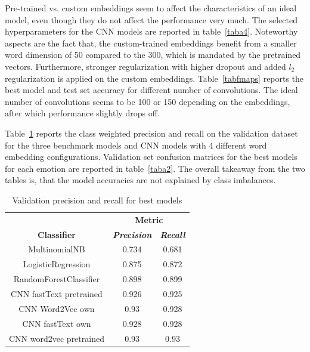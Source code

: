\documentclass[conference]{IEEEtran}
\begin{document}
Pre-trained vs. custom embeddings seem to affect the characteristics of an ideal model, even though they do not affect the performance very much. The selected hyperparameters for the CNN models are reported in table~\ref{taba4}. Noteworthy aspects are the fact that, the custom-trained embeddings benefit from a smaller word dimension of 50 compared to the 300, which is mandated by the pretrained vectors. Furthermore, stronger regularization with higher dropout and added $l_2$ regularization is applied on the custom embeddings. Table~\ref{tabfmaps} reports the best model and test set accuracy for different number of convolutions. The ideal number of convolutions seems to be 100 or 150 depending on the embeddings, after which performance slightly drops off.




Table~\ref{tab2} reports the class weighted precision and recall on the validation dataset for the three benchmark models and CNN models with 4 different word embedding configurations. Validation set confusion matrices for the best models for each emotion are reported in table~\ref{taba2}. The overall takeaway from the two tables is, that the model accuracies are not explained by class imbalances.

\begin{table}[htbp]
\caption{Validation precision and recall for best models}
\begin{center}
\begin{tabular}{|c|c|c|}
\hline
\textbf{}&\multicolumn{2}{|c|}{\textbf{Metric}} \\ 
\cline{2-3}
\textbf{Classifier} & \textbf{\textit{Precision}}& \textbf{\textit{Recall}} \\ 
\hline
MultinomialNB & 0.734 & 0.681 \\ 
\hline
LogisticRegression & 0.875 & 0.872 \\ 
\hline
RandomForestClassifier & 0.898 & 0.899 \\ 
\hline
CNN fastText pretrained & 0.926 & 0.925 \\ 
\hline
CNN Word2Vec own & 0.93 & 0.928 \\ 
\hline
CNN fastText own & 0.928 & 0.928 \\ 
\hline
CNN word2vec pretrained & 0.93 & 0.93 \\ 
\hline
\end{tabular}
\label{tab2}
\end{center}
\end{table}
\end{document}
